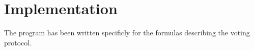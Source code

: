 \chapter{Implementation}
\label{04}


The program has been written specificly for the formulas describing the voting protocol. 


\pagebreak

\pagebreak
